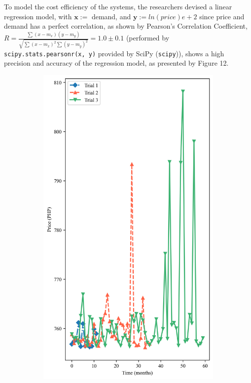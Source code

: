 \documentclass[12pt]{article}
\begin{document}
To model the cost efficiency of the systems, the researchers devised a linear regression model, with $\boldsymbol{x} :=$ demand, and $\boldsymbol{y}:= ln(price) e+2$ since price and demand has a perfect correlation, as shown by Pearson's Correlation Coefficient, $R = \frac{\sum (x-m_x)(y-m_y)}{\sqrt{\sum (x-m_x)^2 \sum (y - m_y)^2}}  = 1.0 \pm 0.1$ (performed by \texttt{scipy.stats.pearsonr(x, y)} provided by SciPy (\texttt{scipy})), shows a high precision and accuracy of the regression model, as presented by Figure 12.

\begin{figure}[h!]
	\centering
	\begin{subfigure}[b]{0.51\textwidth}
		\includegraphics*[width=\textwidth]{fig_3r.png}

\end{subfigure}
\end{figure}
\end{document}
